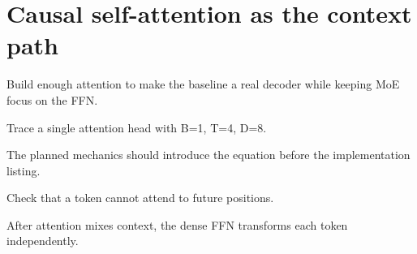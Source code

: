 \section{Causal self-attention as the context path}
\label{sec:ch02-causal-self-attention-as-the-context-path}

Build enough attention to make the baseline a real decoder while keeping MoE focus on the FFN.



Trace a single attention head with B=1, T=4, D=8.



The planned mechanics should introduce the equation before the implementation listing.





\begin{checkpointbox}
Check that a token cannot attend to future positions.
\end{checkpointbox}

After attention mixes context, the dense FFN transforms each token independently.
